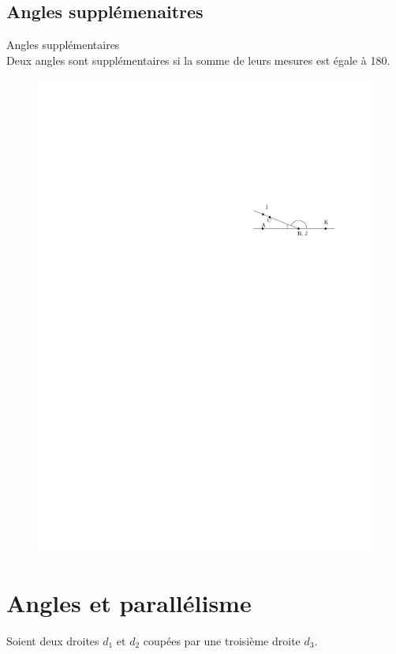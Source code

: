 \documentclass[12pt]{article}
\begin{document}
\subsection*{Angles supplémenaitres}
\begin{multicols}{2}
  \begin{Definition}{Angles supplémentaires}\\
    Deux angles sont supplémentaires si la somme de leurs mesures est égale à 180.
  \end{Definition}
  \begin{figure}[H]
    \centering
    \includegraphics[width=0.8\linewidth]{5x10-angles/sources/supplementaires.pdf}
  \end{figure}
\end{multicols}


\section*{Angles et parallélisme}

Soient deux droites $d_1$ et $d_2$ coupées par une troisième droite $d_3$.
\end{document}
